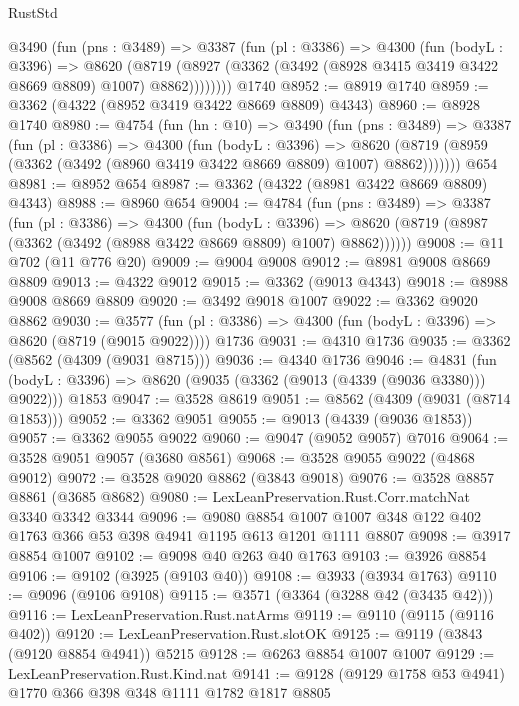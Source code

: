 \begin{lexlean}{RustStd}
\begin{coremodule}
      @3490
        (fun (pns : @3489) =>
        @3387
          (fun (pl : @3386) =>
          @4300
            (fun (bodyL : @3396) =>
            @8620
              (@8719 (@8927 (@3362 (@3492 (@8928 @3415 @3419 @3422 @8669 @8809) @1007) @8862))))))))
    @1740
@8952 := @8919 @1740
@8959 := @3362 (@4322 (@8952 @3419 @3422 @8669 @8809) @4343)
@8960 := @8928 @1740
@8980 := @4754
    (fun (hn : @10) =>
    @3490
      (fun (pns : @3489) =>
      @3387
        (fun (pl : @3386) =>
        @4300
          (fun (bodyL : @3396) =>
          @8620 (@8719 (@8959 (@3362 (@3492 (@8960 @3419 @3422 @8669 @8809) @1007) @8862)))))))
    @654
@8981 := @8952 @654
@8987 := @3362 (@4322 (@8981 @3422 @8669 @8809) @4343)
@8988 := @8960 @654
@9004 := @4784
    (fun (pns : @3489) =>
    @3387
      (fun (pl : @3386) =>
      @4300
        (fun (bodyL : @3396) =>
        @8620 (@8719 (@8987 (@3362 (@3492 (@8988 @3422 @8669 @8809) @1007) @8862))))))
@9008 := @11 @702 (@11 @776 @20)
@9009 := @9004 @9008
@9012 := @8981 @9008 @8669 @8809
@9013 := @4322 @9012
@9015 := @3362 (@9013 @4343)
@9018 := @8988 @9008 @8669 @8809
@9020 := @3492 @9018 @1007
@9022 := @3362 @9020 @8862
@9030 := @3577
    (fun (pl : @3386) => @4300 (fun (bodyL : @3396) => @8620 (@8719 (@9015 @9022))))
    @1736
@9031 := @4310 @1736
@9035 := @3362 (@8562 (@4309 (@9031 @8715)))
@9036 := @4340 @1736
@9046 := @4831
    (fun (bodyL : @3396) => @8620 (@9035 (@3362 (@9013 (@4339 (@9036 @3380))) @9022)))
    @1853
@9047 := @3528 @8619
@9051 := @8562 (@4309 (@9031 (@8714 @1853)))
@9052 := @3362 @9051
@9055 := @9013 (@4339 (@9036 @1853))
@9057 := @3362 @9055 @9022
@9060 := @9047 (@9052 @9057) @7016
@9064 := @3528 @9051 @9057 (@3680 @8561)
@9068 := @3528 @9055 @9022 (@4868 @9012)
@9072 := @3528 @9020 @8862 (@3843 @9018)
@9076 := @3528 @8857 @8861 (@3685 @8682)
@9080 := LexLeanPreservation.Rust.Corr.matchNat @3340 @3342 @3344
@9096 := @9080
    @8854
    @1007
    @1007
    @348
    @122
    @402
    @1763
    @366
    @53
    @398
    @4941
    @1195
    @613
    @1201
    @1111
    @8807
@9098 := @3917 @8854 @1007
@9102 := @9098 @40 @263 @40 @1763
@9103 := @3926 @8854
@9106 := @9102 (@3925 (@9103 @40))
@9108 := @3933 (@3934 @1763)
@9110 := @9096 (@9106 @9108)
@9115 := @3571 (@3364 (@3288 @42 (@3435 @42)))
@9116 := LexLeanPreservation.Rust.natArms
@9119 := @9110 (@9115 (@9116 @402))
@9120 := LexLeanPreservation.Rust.slotOK
@9125 := @9119 (@3843 (@9120 @8854 @4941)) @5215
@9128 := @6263 @8854 @1007 @1007
@9129 := LexLeanPreservation.Rust.Kind.nat
@9141 := @9128 (@9129 @1758 @53 @4941) @1770 @366 @398 @348 @1111 @1782 @1817 @8805

\end{coremodule}
\end{lexlean}
